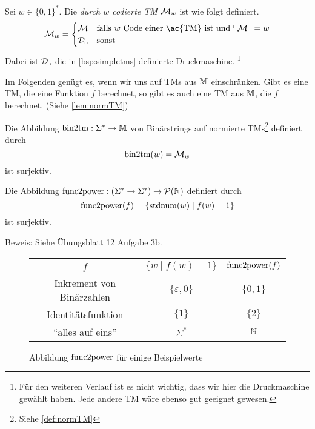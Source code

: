 \begin{Def}[name={[Durch Binärstring codierte \ac{TM}]}]
	Sei $w\in\{0,1\}^*$.
	Die \emph{durch $w$ codierte \ac{TM}} $\mathcal{M}_w$ ist wie folgt definiert.
	$$\M_w=\begin{cases}
		\M & \text{falls } w \text{ Code einer \ac{TM} ist und } \godel{\M}=w\\
		\D_\mblank & \text{sonst}
	\end{cases}$$
	Dabei ist $\D_\mblank$ die in \autoref{bsp:simpletms} definierte Druckmaschine.%
	\footnote{Für den weiteren Verlauf ist es nicht wichtig, dass wir hier die Druckmaschine gewählt haben. Jede andere \ac{TM} wäre ebenso gut geeignet gewesen.}
\end{Def}


\begin{Bemerkung}
	Im Folgenden genügt es, wenn wir uns auf \ac{TM}s aus $\mathbb{M}$ einschränken.
	Gibt es eine \ac{TM}, die eine Funktion $f$ berechnet, so gibt es auch eine \ac{TM} aus $\mathbb{M}$, die $f$ berechnet.
	(Siehe \autoref{lem:normTM})
\end{Bemerkung}


\begin{lemma}[name={[$\bintotm$]}]\label{satz:bintotm}
	Die Abbildung $\operatorname{bin2tm}: \Sigma^*\rightarrow \mathbb{M}$ von Binärstrings auf normierte \acp{TM}\footnote{Siehe \autoref{def:normTM}} 
	definiert durch
	$$ \operatorname{bin2tm}(w)=\mathcal{M}_w$$
	ist surjektiv.
	\index{$\bintotm$}
\end{lemma}


\begin{lemma}[name={[$\functopower$]}]\label{satz:functopower}
	Die Abbildung $\operatorname{func2power}:(\Sigma^*\rightarrow\Sigma^*)\rightarrow \mathcal{P}(\mathbb{N})$
	definiert durch
	$$\operatorname{func2power}(f)=\{\operatorname{stdnum}(w)\mid f(w)=1\}$$
	ist surjektiv.
	\index{$\functopower$}
\end{lemma}
Beweis: Siehe Übungsblatt 12 Aufgabe 3b.


\begin{figure}[H]\centering
	\begin{tabular}{ccc}
		$f$ & $\{w\mid f(w)=1\}$ & $\operatorname{func2power}(f)$\\ \hline
		Inkrement von Binärzahlen & $\{\varepsilon, 0\}$ & $\{0,1\}$\\
		Identitätsfunktion & $\{1\}$ & $\{2\}$\\
		"`alles auf eins"' & $\Sigma^*$ & $\mathbb{N}$
	\end{tabular}
	
	\caption{Abbildung $\functopower$ für einige Beispielwerte}
\end{figure}


